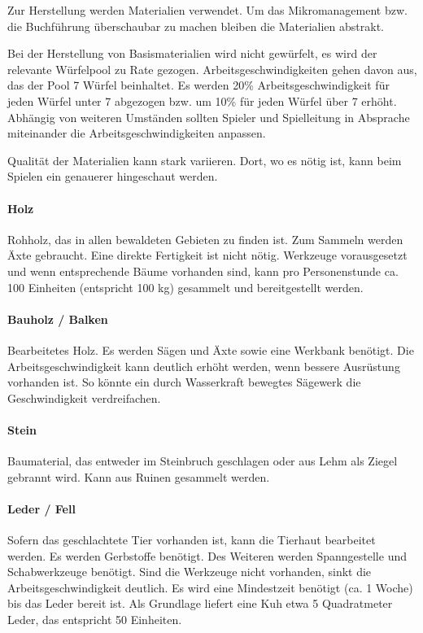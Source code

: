 \documentclass{article}
\begin{document}
Zur Herstellung werden Materialien verwendet. Um das Mikromanagement bzw. die Buchführung überschaubar zu machen
bleiben die Materialien abstrakt.

Bei der Herstellung von Basismaterialien wird nicht gewürfelt, es wird der relevante Würfelpool zu Rate gezogen.
Arbeitsgeschwindigkeiten gehen davon aus, das der Pool 7 Würfel beinhaltet. Es werden 20\% Arbeitsgeschwindigkeit für
jeden Würfel unter 7 abgezogen bzw. um 10\% für jeden Würfel über 7 erhöht. Abhängig von weiteren Umständen sollten
Spieler und Spielleitung in Absprache miteinander die Arbeitsgeschwindigkeiten anpassen.

Qualität der Materialien kann stark variieren. Dort, wo es nötig ist, kann beim Spielen ein genauerer hingeschaut
werden.

\paragraph{Holz}

Rohholz, das in allen bewaldeten Gebieten zu finden ist. Zum Sammeln werden Äxte gebraucht. Eine direkte Fertigkeit
ist nicht nötig. Werkzeuge vorausgesetzt und wenn entsprechende Bäume vorhanden sind, kann pro Personenstunde ca.
100 Einheiten (entspricht 100 kg) gesammelt und bereitgestellt werden.

\paragraph{Bauholz / Balken}

Bearbeitetes Holz. Es werden Sägen und Äxte sowie eine Werkbank benötigt. Die Arbeitsgeschwindigkeit kann deutlich
erhöht werden, wenn bessere Ausrüstung vorhanden ist. So könnte ein durch Wasserkraft bewegtes Sägewerk die
Geschwindigkeit verdreifachen.

\paragraph{Stein}

Baumaterial, das entweder im Steinbruch geschlagen oder aus Lehm als Ziegel gebrannt wird. Kann aus Ruinen gesammelt
werden.

\paragraph{Leder / Fell}

Sofern das geschlachtete Tier vorhanden ist, kann die Tierhaut bearbeitet werden. Es werden Gerbstoffe benötigt.
Des Weiteren werden Spanngestelle und Schabwerkzeuge benötigt. Sind die Werkzeuge nicht vorhanden, sinkt die
Arbeitsgeschwindigkeit deutlich. Es wird eine Mindestzeit benötigt (ca. 1 Woche) bis das Leder bereit ist. Als
Grundlage liefert eine Kuh etwa 5 Quadratmeter Leder, das entspricht 50 Einheiten.
\end{document}
